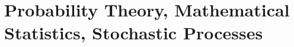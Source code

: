 \documentclass[../../book-en.tex]{subfiles}
\begin{document}
\chapter{Probability Theory, Mathematical Statistics, Stochastic Processes}
\label{ch:1.2-probability-stats-en}














\end{document}
